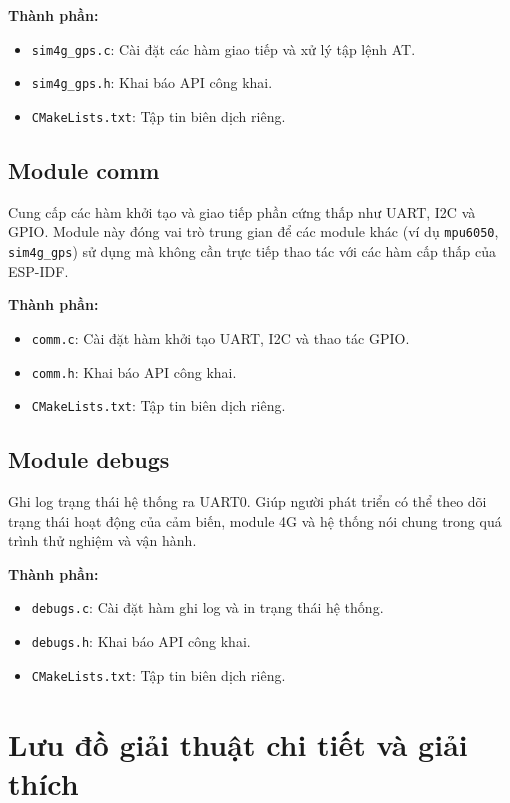 \documentclass[a4paper,12pt]{report}
\begin{document}
	\textbf{Thành phần:}
	\begin{itemize}
		\item \texttt{sim4g\_gps.c}: Cài đặt các hàm giao tiếp và xử lý tập lệnh AT.
		\item \texttt{sim4g\_gps.h}: Khai báo API công khai.
		\item \texttt{CMakeLists.txt}: Tập tin biên dịch riêng.
	\end{itemize}
	
	\subsection{Module comm}
	
	Cung cấp các hàm khởi tạo và giao tiếp phần cứng thấp như UART, I2C và GPIO. Module này đóng vai trò trung gian để các module khác (ví dụ \texttt{mpu6050}, \texttt{sim4g\_gps}) sử dụng mà không cần trực tiếp thao tác với các hàm cấp thấp của ESP-IDF.
	
	\textbf{Thành phần:}
	\begin{itemize}
		\item \texttt{comm.c}: Cài đặt hàm khởi tạo UART, I2C và thao tác GPIO.
		\item \texttt{comm.h}: Khai báo API công khai.
		\item \texttt{CMakeLists.txt}: Tập tin biên dịch riêng.
	\end{itemize}
	
	\subsection{Module debugs}
	
	Ghi log trạng thái hệ thống ra UART0. Giúp người phát triển có thể theo dõi trạng thái hoạt động của cảm biến, module 4G và hệ thống nói chung trong quá trình thử nghiệm và vận hành.
	
	\textbf{Thành phần:}
	\begin{itemize}
		\item \texttt{debugs.c}: Cài đặt hàm ghi log và in trạng thái hệ thống.
		\item \texttt{debugs.h}: Khai báo API công khai.
		\item \texttt{CMakeLists.txt}: Tập tin biên dịch riêng.
	\end{itemize}
	
	\newpage
	
	\section{Lưu đồ giải thuật chi tiết và giải thích}
	
\end{document}
